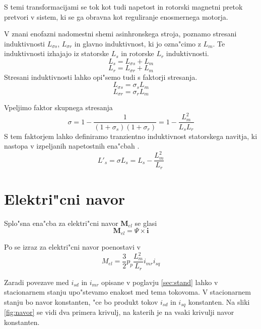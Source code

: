 \documentclass[journal,a4paper,twoside]{sty/IEEEtran}
\begin{document}
S temi transformacijami se tok kot tudi napetost in rotorski magnetni pretok pretvori v sistem, ki se ga obravna kot reguliranje enosmernega motorja.

V  znani enofazni nadomestni shemi asinhronskega stroja, poznamo stresani induktivnosti $L_{\sigma s}$, $L_{\sigma r}$ in glavno induktivnost, ki jo ozna"cimo z $L_m$. Te induktivnosti izhajajo iz statorske $L_s$ in rotorske $L_r$ induktivnosti.
\begin{equation}
L_s=L_{\sigma s}+L_m
\end{equation}
\begin{equation}
L_r=L_{\sigma r}+L_m
\end{equation}
Stresani induktivnosti lahko opi"semo tudi s faktorji stresanja.
\begin{equation}
L_{\sigma s}= \sigma_sL_m
\end{equation}
\begin{equation}
L_{\sigma r}= \sigma_rL_m
\end{equation}

Vpeljimo faktor skupnega stresanja
\begin{equation}
\sigma=1-\frac{1}{(1+\sigma_s)(1+\sigma_r)}=1-\frac{L_m^2}{L_sL_r}
\end{equation}
S  tem faktorjem lahko definiramo tranzientno induktivnost statorskega navitja, ki nastopa v  izpeljanih napetostnih ena"cbah \cite{servopogoni}.
\begin{equation}
L'_s=\sigma L_s= L_s- \frac{L_m^2}{L_r}
\end{equation}

\section{Elektri"cni navor}

Splo"sna ena"cba za elektri"cni navor $\textbf{M}_{el}$ se glasi
\begin{equation}
\textbf{M}_{el}
=
\textbf{$\Psi$}
\times
\textbf{i}
\end{equation}

Po \cite{servopogoni} se izraz za elektri"cni navor poenostavi v
\begin{equation}
\label{eq:navor1}
M_{el}= \frac{3}{2}p_p \frac{L_m^2}{L_r}i_{mr}i_{sq}
\end{equation}

Zaradi povezave med $i_{sd}$ in $i_{mr}$ opisane v poglavju \ref{sec:stand} lahko v stacionarnem stanju upo"stevamo enakost med tema tokovoma. V stacionarnem stanju bo navor konstanten, "ce bo produkt tokov $i_{sd}$ in $i_{sq}$ konstanten. Na sliki \ref{fig:navor} se vidi dva primera krivulj, na katerih je na vsaki krivulji navor konstanten. 
\end{document}
